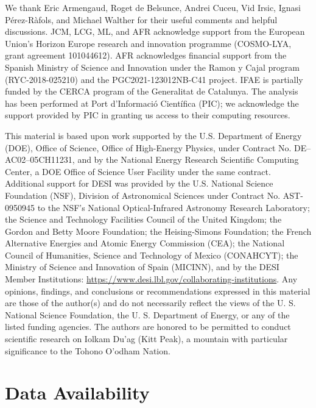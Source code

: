 \documentclass[longauth]{aa}
\begin{document}

\begin{acknowledgements}
We thank Eric Armengaud, Roget de Belsunce, Andrei Cuceu, Vid Irsic, Ignasi P\'erez-R\`afols, and Michael Walther for their useful comments and helpful discussions. JCM, LCG, ML, and AFR acknowledge support from the European Union’s Horizon Europe research and innovation programme (COSMO-LYA, grant agreement 101044612). AFR acknowledges financial support from the Spanish Ministry of Science and Innovation under the Ramon y Cajal program (RYC-2018-025210) and the PGC2021-123012NB-C41 project. IFAE is partially funded by the CERCA program of the Generalitat de Catalunya. The analysis has been performed at Port d’Informaci\'o Cient\'ifica (PIC); we acknowledge the support provided by PIC in granting us access to their computing resources.

This material is based upon work supported by the U.S. Department of Energy (DOE), Office of Science, Office of High-Energy Physics, under Contract No. DE–AC02–05CH11231, and by the National Energy Research Scientific Computing Center, a DOE Office of Science User Facility under the same contract. Additional support for DESI was provided by the U.S. National Science Foundation (NSF), Division of Astronomical Sciences under Contract No. AST-0950945 to the NSF’s National Optical-Infrared Astronomy Research Laboratory; the Science and Technology Facilities Council of the United Kingdom; the Gordon and Betty Moore Foundation; the Heising-Simons Foundation; the French Alternative Energies and Atomic Energy Commission (CEA); the National Council of Humanities, Science and Technology of Mexico (CONAHCYT); the Ministry of Science and Innovation of Spain (MICINN), and by the DESI Member Institutions: \url{https://www.desi.lbl.gov/collaborating-institutions}. Any opinions, findings, and conclusions or recommendations expressed in this material are those of the author(s) and do not necessarily reflect the views of the U. S. National Science Foundation, the U. S. Department of Energy, or any of the listed funding agencies. The authors are honored to be permitted to conduct scientific research on Iolkam Du’ag (Kitt Peak), a mountain with particular significance to the Tohono O’odham Nation.
\end{acknowledgements}

\section*{Data Availability}
\end{document}
